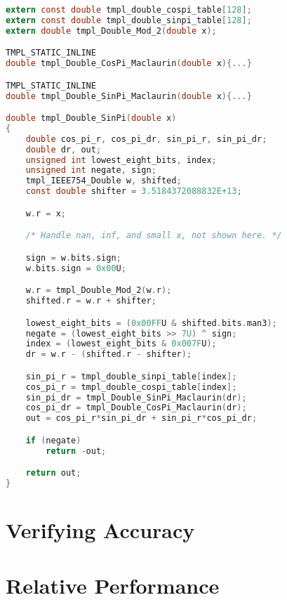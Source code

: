 \documentclass{article}
\theoremstyle{plain}
\begin{document}
        \begin{mdframed}
            \begin{lstlisting}[language={C}]
extern const double tmpl_double_cospi_table[128];
extern const double tmpl_double_sinpi_table[128];
extern double tmpl_Double_Mod_2(double x);

TMPL_STATIC_INLINE
double tmpl_Double_CosPi_Maclaurin(double x){...}

TMPL_STATIC_INLINE
double tmpl_Double_SinPi_Maclaurin(double x){...}

double tmpl_Double_SinPi(double x)
{
    double cos_pi_r, cos_pi_dr, sin_pi_r, sin_pi_dr;
    double dr, out;
    unsigned int lowest_eight_bits, index;
    unsigned int negate, sign;
    tmpl_IEEE754_Double w, shifted;
    const double shifter = 3.5184372088832E+13;

    w.r = x;

    /* Handle nan, inf, and small x, not shown here. */

    sign = w.bits.sign;
    w.bits.sign = 0x00U;

    w.r = tmpl_Double_Mod_2(w.r);
    shifted.r = w.r + shifter;

    lowest_eight_bits = (0x00FFU & shifted.bits.man3);
    negate = (lowest_eight_bits >> 7U) ^ sign;
    index = (lowest_eight_bits & 0x007FU);
    dr = w.r - (shifted.r - shifter);

    sin_pi_r = tmpl_double_sinpi_table[index];
    cos_pi_r = tmpl_double_cospi_table[index];
    sin_pi_dr = tmpl_Double_SinPi_Maclaurin(dr);
    cos_pi_dr = tmpl_Double_CosPi_Maclaurin(dr);
    out = cos_pi_r*sin_pi_dr + sin_pi_r*cos_pi_dr;

    if (negate)
        return -out;

    return out;
}
            \end{lstlisting}
        \end{mdframed}

    \section{Verifying Accuracy}
    \section{Relative Performance}
    
    
\end{document}
